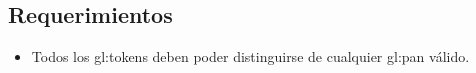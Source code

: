 %
%

\subsection{Requerimientos}

\begin{itemize}
  \item Todos los \glspl{gl:token} deben poder distinguirse de cualquier
    \acrshort{gl:pan} válido.
\end{itemize}




